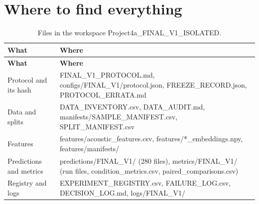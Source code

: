 \documentclass[11pt,a4paper]{article}
\begin{document}
\section{Where to find everything}\label{sec:app-files}
\begin{center}\small\renewcommand{\arraystretch}{1.15}
\begin{longtable}{>{\raggedright\arraybackslash}p{3.57cm}>{\raggedright\arraybackslash}p{12.09cm}}
\caption{Files in the workspace Project4a\_FINAL\_V1\_ISOLATED.}\\
\toprule
\textbf{\hspace{0pt}What} & \textbf{\hspace{0pt}Where}\\\midrule\endfirsthead
\toprule
\textbf{\hspace{0pt}What} & \textbf{\hspace{0pt}Where}\\\midrule\endhead
\bottomrule\endfoot
\hspace{0pt}Protocol and its hash & \hspace{0pt}FINAL\_\allowbreak{}V1\_\allowbreak{}PROTOCOL.md, configs/\allowbreak{}FINAL\_\allowbreak{}V1/\allowbreak{}protocol.json, FREEZE\_\allowbreak{}RECORD.json, PROTOCOL\_\allowbreak{}ERRATA.md\\
\hspace{0pt}Data and splits & \hspace{0pt}DATA\_\allowbreak{}INVENTORY.csv, DATA\_\allowbreak{}AUDIT.md, manifests/\allowbreak{}SAMPLE\_\allowbreak{}MANIFEST.csv, SPLIT\_\allowbreak{}MANIFEST.csv\\
\hspace{0pt}Features & \hspace{0pt}features/\allowbreak{}acoustic\_\allowbreak{}features.csv, features/\allowbreak{}*\_\allowbreak{}embeddings.npy, features/\allowbreak{}manifests/\allowbreak{}\\
\hspace{0pt}Predictions and metrics & \hspace{0pt}predictions/\allowbreak{}FINAL\_\allowbreak{}V1/\allowbreak{} (280 files), metrics/\allowbreak{}FINAL\_\allowbreak{}V1/\allowbreak{} (run files, condition\_\allowbreak{}metrics.csv, paired\_\allowbreak{}comparisons.csv)\\
\hspace{0pt}Registry and logs & \hspace{0pt}EXPERIMENT\_\allowbreak{}REGISTRY.csv, FAILURE\_\allowbreak{}LOG.csv, DECISION\_\allowbreak{}LOG.md, logs/\allowbreak{}FINAL\_\allowbreak{}V1/\allowbreak{}\\

\end{longtable}
\end{center}
\end{document}
